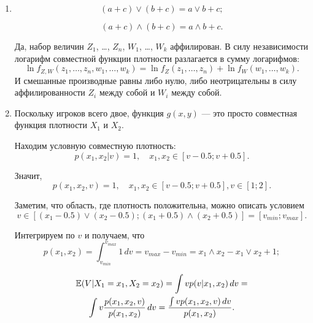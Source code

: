 \begin{enumerate}


\item
\begin{equation}
(a+c)\vee (b+c)=a\vee b +c;
\end{equation}

\begin{equation}
(a+c)\wedge (b+c)=a\wedge b +c.
\end{equation}

Да, набор величин $ Z_{1} $, \ldots , $ Z_{n} $, $ W_{1} $, \ldots , $ W_{k} $ аффилирован. В силу независимости логарифм совместной функции плотности разлагается в сумму логарифмов: 
\begin{equation}
\ln f_{Z,W}(z_{1},\ldots ,z_{n},w_{1},\ldots ,w_{k})= \ln f_{Z}(z_{1},\ldots ,z_{n})+\ln f_{W}(w_{1},\ldots ,w_{k}).
\end{equation}
И смешанные производные равны либо нулю, либо неотрицательны в силу аффилированности $ Z_{i} $ между собой и $ W_{i} $ между собой.

\item  Поскольку игроков всего двое, функция $ g(x,y)$ — это просто совместная функция плотности $ X_{1} $ и $ X_{2} $.

Находим условную совместную плотность:
\begin{equation}
p(x_{1},x_{2}|v)=1, \quad x_{1},x_{2}\in [v-0.5;v+0.5].
\end{equation}

Значит,
\begin{equation}
p(x_{1},x_{2},v)=1, \quad x_{1},x_{2}\in [v-0.5;v+0.5],v\in [1;2].
\end{equation}

Заметим, что область, где плотность положительна, можно описать условием
\begin{equation}
v\in [(x_{1}-0.5)\vee (x_{2}-0.5); (x_{1}+0.5)\wedge (x_{2}+0.5)]=[v_{min};v_{max}].
\end{equation}

Интегрируем по $ v $ и получаем, что
\begin{equation}
p(x_{1},x_{2})=\int_{v_{min}}^{v_{max}} 1 \, dv= v_{max}-v_{min}=x_{1}\wedge x_{2}-x_{1}\vee x_{2}+1;
\end{equation}

\begin{multline}
\operatorname{\mathbb{E}}(V|X_{1}=x_{1}, X_{2}=x_{2})=\int v p(v|x_{1},x_{2}) \, dv=\\
\int v \frac{p(x_{1},x_{2},v)}{p(x_{1},x_{2})} \, dv=
\frac{\int v p(x_{1},x_{2},v) \, dv }{p(x_{1},x_{2})}.
\end{multline}


\end{enumerate}
